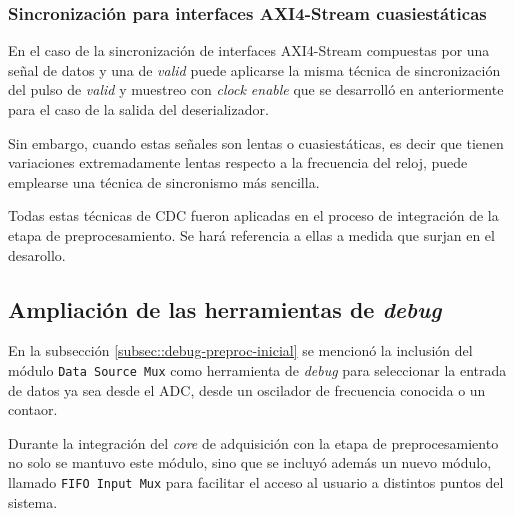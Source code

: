 \documentclass[../../main.tex]{subfiles}
\begin{document}
\subsubsection{Sincronización para interfaces AXI4-Stream cuasiestáticas}
En el caso de la sincronización de interfaces AXI4-Stream compuestas por una señal de datos y una de \textit{valid} puede aplicarse la misma técnica de sincronización del pulso de \textit{valid} y muestreo con \textit{clock enable} que se desarrolló en anteriormente para el caso de la salida del deserializador.

Sin embargo, cuando estas señales son lentas o cuasiestáticas, es decir que tienen variaciones extremadamente lentas respecto a la frecuencia del reloj, puede emplearse una técnica de sincronismo más sencilla.


Todas estas técnicas de CDC fueron aplicadas en el proceso de integración de la etapa de preprocesamiento. Se hará referencia a ellas a medida que surjan en el desarollo.

\subsection{Ampliación de las herramientas de \textit{debug}}
En la subsección \ref{subsec::debug-preproc-inicial} se mencionó la inclusión del módulo \texttt{Data Source Mux} como herramienta de \textit{debug} para seleccionar la entrada de datos ya sea desde el ADC, desde un oscilador de frecuencia conocida o un contaor.

Durante la integración del \textit{core} de adquisición con la etapa de preprocesamiento no solo se mantuvo este módulo, sino que se incluyó además un nuevo módulo, llamado \texttt{FIFO Input Mux} para facilitar el acceso al usuario a distintos puntos del sistema.
\end{document}
